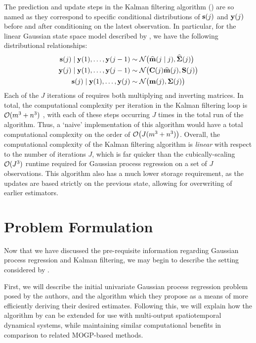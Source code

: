 \documentclass[10pt]{article}
\begin{document}
The prediction and update steps in the Kalman filtering algorithm () are so named as they correspond to specific conditional distributions of $\mathbf{s}(j)$ and $\mathbf{y}(j)$ before and after conditioning on the latest observation. In particular, for the linear Gaussian state space model described by , we have the following distributional relationships:
\begin{subequations}
    \label{eq:Kalman-conditionals}
    \begin{align}
        \bfs(j) \mid \bfy(1), \dots, \bfy(j-1) &\sim \calN\big(\widehat{\bfm}(j\mid j), \widehat{\bfSigma}(j)\big) \\%
        \bfy(j) \mid \bfy(1), \dots, \bfy(j-1) &\sim \calN\big(\bfC(j)\widehat{\bfm}(j), \bfS(j)\big) \\%
        \bfs(j) \mid \bfy(1), \dots, \bfy(j) &\sim \calN\big(\bfm(j), \bfSigma(j)\big)
    \end{align}
\end{subequations}
Each of the $J$ iterations of  requires both multiplying and inverting matrices.  In total, the computational complexity per iteration in the Kalman filtering loop is $\mathcal{O}(m^{3} + n^{3})$ \citep{Kalman-Complexity-2019}, with each of these steps occurring $J$ times in the total run of the algorithm. Thus, a `naive' implementation of this algorithm would have a total computational complexity on the order of $\mathcal{O}\big(J(m^{3} + n^{3})\big)$. Overall, the computational complexity of the Kalman filtering algorithm is \emph{linear} with respect to the number of iterations $J$, which is far quicker than the cubically-scaling $\mathcal{O}(J^3)$ runtime required for Gaussian process regression on a set of $J$ observations. This algorithm also has a much lower storage requirement, as the updates are based strictly on the previous state, allowing for overwriting of earlier estimators.

\section{Problem Formulation}
\label{sec:problem}
Now that we have discussed the pre-requisite information regarding Gaussian process regression and Kalman filtering, we may begin to describe the setting considered by \citeauthor{Todescato-Efficient-2020}.

First, we will describe the initial univariate Gaussian process regression problem posed by the authors, and the algorithm which they propose as a means of more efficiently deriving their desired estimates. Following this, we will explain how the algorithm by \citeauthor{Todescato-Efficient-2020} can be extended for use with multi-output spatiotemporal dynamical systems, while maintaining similar computational benefits in comparison to related MOGP-based methods.
\end{document}
